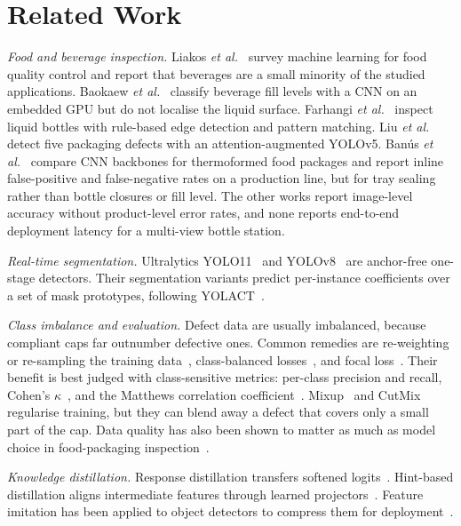 \documentclass[conference]{IEEEtran}
\begin{document}
\section{Related Work}
\textit{Food and beverage inspection.} Liakos \textit{et al.}~\cite{liakos2025} survey machine learning for food quality control and report that beverages are a small minority of the studied applications. Baokaew \textit{et al.}~\cite{chatchapol2024} classify beverage fill levels with a CNN on an embedded GPU but do not localise the liquid surface. Farhangi \textit{et al.}~\cite{farhangi2024} inspect liquid bottles with rule-based edge detection and pattern matching. Liu \textit{et al.}~\cite{liu2025} detect five packaging defects with an attention-augmented YOLOv5. Banús \textit{et al.}~\cite{banus2021} compare CNN backbones for thermoformed food packages and report inline false-positive and false-negative rates on a production line, but for tray sealing rather than bottle closures or fill level. The other works report image-level accuracy without product-level error rates, and none reports end-to-end deployment latency for a multi-view bottle station.

\textit{Real-time segmentation.} Ultralytics YOLO11~\cite{yolo11} and YOLOv8~\cite{yolov8} are anchor-free one-stage detectors. Their segmentation variants predict per-instance coefficients over a set of mask prototypes, following YOLACT~\cite{bolya2019}.

\textit{Class imbalance and evaluation.} Defect data are usually imbalanced, because compliant caps far outnumber defective ones. Common remedies are re-weighting or re-sampling the training data~\cite{buda2018}, class-balanced losses~\cite{cui2019}, and focal loss~\cite{lin2017}. Their benefit is best judged with class-sensitive metrics: per-class precision and recall, Cohen's $\kappa$~\cite{cohen1960}, and the Matthews correlation coefficient~\cite{chicco2020}. Mixup~\cite{zhang2018} and CutMix~\cite{yun2019} regularise training, but they can blend away a defect that covers only a small part of the cap. Data quality has also been shown to matter as much as model choice in food-packaging inspection~\cite{xiong2024}.

\textit{Knowledge distillation.} Response distillation transfers softened logits~\cite{hinton2015}. Hint-based distillation aligns intermediate features through learned projectors~\cite{romero2015}. Feature imitation has been applied to object detectors to compress them for deployment~\cite{wang2019}.
\end{document}
